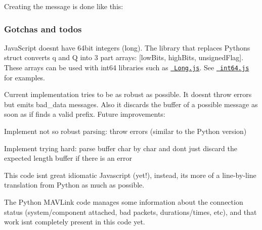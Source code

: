 Creating the message is done like this\+:


\begin{DoxyCode}{0}
\DoxyCodeLine{}
\end{DoxyCode}


\subsubsection*{Gotchas and todo\textquotesingle{}s}

Java\+Script doesn\textquotesingle{}t have 64bit integers (long). The library that replaces Pythons struct converts {\ttfamily q} and {\ttfamily Q} into 3 part arrays\+: {\ttfamily \mbox{[}low\+Bits, high\+Bits, unsigned\+Flag\mbox{]}}. These arrays can be used with int64 libraries such as \href{https://github.com/dcodeIO/Long.js}{\texttt{ Long.\+js}}. See \href{https://github.com/AndreasAntener/node-jspack/blob/master/test/int64.js}{\texttt{ int64.\+js}} for examples.

Current implementation tries to be as robust as possible. It doesn\textquotesingle{}t throw errors but emits bad\+\_\+data messages. Also it discards the buffer of a possible message as soon as if finds a valid prefix. Future improvements\+:
\begin{DoxyItemize}
\item Implement not so robust parsing\+: throw errors (similar to the Python version)
\item Implement trying hard\+: parse buffer char by char and don\textquotesingle{}t just discard the expected length buffer if there is an error
\end{DoxyItemize}

This code isn\textquotesingle{}t great idiomatic Javascript (yet!), instead, it\textquotesingle{}s more of a line-\/by-\/line translation from Python as much as possible.

The Python M\+A\+V\+Link code manages some information about the connection status (system/component attached, bad packets, durations/times, etc), and that work isn\textquotesingle{}t completely present in this code yet.

